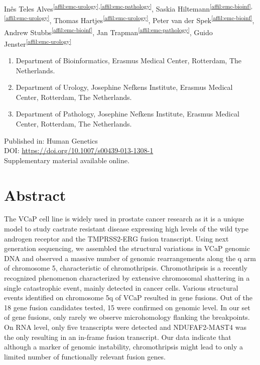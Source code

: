 

Inês Teles Alves\textsuperscript{\ref{affil:emc-urology},\ref{affil:emc-pathology}},
Saskia Hiltemann\textsuperscript{\ref{affil:emc-bioinf},\ref{affil:emc-urology}},
Thomas Hartjes\textsuperscript{\ref{affil:emc-urology}},
Peter van der Spek\textsuperscript{\ref{affil:emc-bioinf}},
Andrew Stubbs\textsuperscript{\ref{affil:emc-bioinf}},
Jan Trapman\textsuperscript{\ref{affil:emc-pathology}},
Guido Jenster\textsuperscript{\ref{affil:emc-urology}}

\small
\begin{enumerate}
\itemsep-0.5em
\item Department of Bioinformatics, Erasmus Medical Center, Rotterdam, The Netherlands. \label{affil:emc-bioinf}
\item Department of Urology, Josephine Nefkens Institute, Erasmus Medical Center, Rotterdam, The Netherlands. \label{affil:emc-urology}
\item Department of Pathology, Josephine Nefkens Institute, Erasmus Medical Center, Rotterdam, The Netherlands. \label{affil:emc-pathology}
\end{enumerate}
\normalsize


Published in: Human Genetics \\
DOI: \url{https://doi.org/10.1007/s00439-013-1308-1} \\
Supplementary material available online. \\

\section*{Abstract}
The VCaP cell line is widely used in prostate cancer research as it is a unique model to study castrate resistant disease expressing high levels of the wild type androgen receptor and the TMPRSS2-ERG fusion transcript. Using next generation sequencing, we assembled the structural variations in VCaP genomic DNA and observed a massive number of genomic rearrangements along the q arm of chromosome 5, characteristic of chromothripsis. Chromothripsis is a recently recognized phenomenon characterized by extensive chromosomal shattering in a single catastrophic event, mainly detected in cancer cells. Various structural events identified on chromosome 5q of VCaP resulted in gene fusions. Out of the 18 gene fusion candidates tested, 15 were confirmed on genomic level. In our set of gene fusions, only rarely we observe microhomology flanking the breakpoints. On RNA level, only five transcripts were detected and NDUFAF2-MAST4 was the only resulting in an in-frame fusion transcript. Our data indicate that although a marker of genomic instability, chromothripsis might lead to only a limited number of functionally relevant fusion genes.


